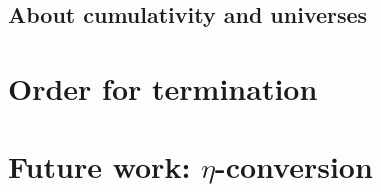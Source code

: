 \subsection{About cumulativity and universes}

\section{Order for termination}

\section{Future work: \(\eta\)-conversion}

